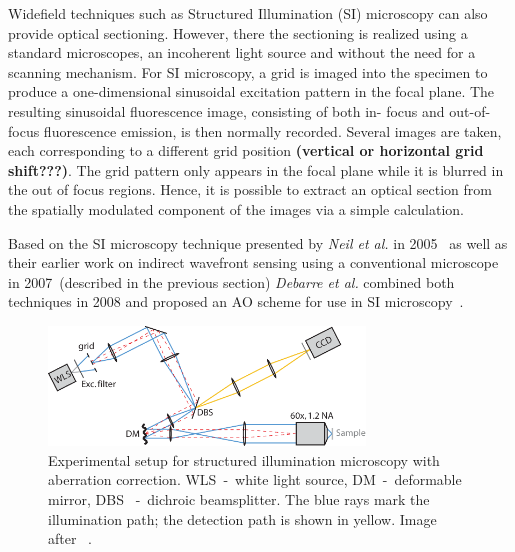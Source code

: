 Widefield techniques such as Structured Illumination (SI) microscopy can also provide optical sectioning. However, there the sectioning is realized using a standard microscopes, an incoherent light source and without the need for a scanning mechanism. For SI microscopy, a grid is imaged into the specimen to produce a one-dimensional sinusoidal excitation pattern in the focal plane. The resulting sinusoidal fluorescence image, consisting of both in- focus and out-of-focus fluorescence emission, is then normally recorded. Several images are taken, each corresponding to a different grid position \textbf{(vertical or horizontal grid shift???)}. The grid pattern only appears in the focal plane while it is blurred in the out of focus regions. Hence, it is possible to extract an optical section from the spatially modulated component of the images via a simple calculation.

Based on the SI microscopy technique presented by \emph{Neil et al.} in 2005~\cite{wide_structured_illu_principle} as well as their earlier work on indirect wavefront sensing using a conventional microscope~\cite{wide_AOM_loew_freq} in 2007~(described in the previous section) \emph{Debarre et al.} combined both techniques in 2008 and proposed an AO scheme for use in SI microscopy~\cite{wide_AOM_structured_illu}.  

\begin{figure}
	\centering
		\includegraphics[width=0.75\textwidth]{images/wide_structured_illumination.pdf}
	\caption{Experimental setup for structured illumination microscopy with 
aberration correction. WLS~-~white light source, DM~-~deformable mirror, DBS
~-~dichroic beamsplitter. The blue rays mark the illumination path; the 
detection path is shown in yellow. Image after~\cite{wide_AOM_structured_illu}
.}
	\label{fig:wide_structured_illumination}
\end{figure}

